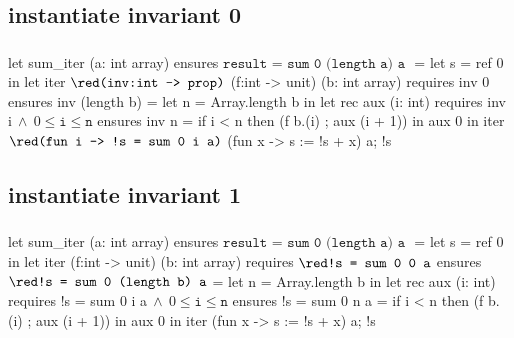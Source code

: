 \documentclass[xcolor=dvipsnames]{beamer}
\newcommand{\bwedge}{\boldsymbol{~\wedge~}}
\begin{document}
\subsection*{instantiate invariant 0}
\begin{frame}[fragile]
\frametitle{}
\vspace*{0em}
\begin{footnotesize}
\begin{whycode}
let sum_iter (a: int array) 
ensures { $\texttt{result = sum 0 (length a) a }$}
= let s = ref 0 in 
  let iter ${\red \texttt{(inv:int -> prop)}}$ (f:int -> unit) (b: int array)
  requires { inv 0 } 
  ensures  { inv (length b) } 
  = let n = Array.length b in
    let rec aux (i: int)
    requires { inv i$\bwedge 0 \leq \texttt{i} \leq \texttt{n}$ }
    ensures  { inv n }
    = if i < n
      then (f b.(i) ; aux (i + 1)) 
    in aux 0
  in iter ${\red \texttt{(fun i -> !s = sum 0 i a)}}$ (fun x -> s := !s + x) a; 
  !s
\end{whycode}
\end{footnotesize}
\end{frame}
\addtocounter{framenumber}{-1}

\subsection*{instantiate invariant 1}
\begin{frame}[fragile]
\frametitle{}
\vspace*{0em}
\begin{footnotesize}
\begin{whycode}
let sum_iter (a: int array) 
ensures { $\texttt{result = sum 0 (length a) a }$}
= let s = ref 0 in 
  let iter (f:int -> unit) (b: int array)
  requires { ${\red \texttt{!s = sum 0 0 a}}$ } 
  ensures  { ${\red \texttt{!s = sum 0 (length b) a}}$ } 
  = let n = Array.length b in
    let rec aux (i: int)
    requires { !s = sum 0 i a$\bwedge 0 \leq \texttt{i} \leq \texttt{n}$ }
    ensures  { !s = sum 0 n a }
    = if i < n
      then (f b.(i) ; aux (i + 1)) 
    in aux 0
  in iter (fun x -> s := !s + x) a; 
  !s
\end{whycode}
\end{footnotesize}
\end{frame}
\addtocounter{framenumber}{-1}
\end{document}
